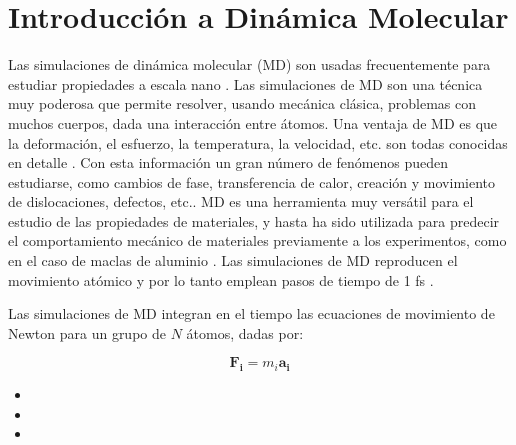 
\section{Introducción a Dinámica Molecular}
\label{S2_2}

Las simulaciones de dinámica molecular (MD) son usadas frecuentemente para estudiar propiedades a escala nano \citep{allen87}. Las simulaciones de MD son una técnica muy poderosa que permite resolver, usando mecánica clásica, problemas con muchos cuerpos, dada una interacción entre átomos. Una ventaja de MD es que la deformación, el esfuerzo, la temperatura, la velocidad, etc. son todas conocidas en detalle \citep{allen87}. Con esta información un gran número de fenómenos pueden estudiarse, como cambios de fase, transferencia de calor, creación y movimiento de dislocaciones, defectos, etc.. MD es una herramienta muy versátil para el estudio de las propiedades de materiales, y hasta ha sido utilizada para predecir el comportamiento mecánico de materiales previamente a los experimentos, como en el caso de maclas de aluminio \citep{chen03}. Las simulaciones de MD reproducen el movimiento atómico y por lo tanto emplean pasos de tiempo de 1 fs \citep{allen87}.

Las simulaciones de MD integran en el tiempo las ecuaciones de movimiento de Newton para un grupo de $N$ átomos, dadas por:

\begin{equation}
\mathbf{F_{i}} = m_{i}\mathbf{a_{i}}
\end{equation}


\begin{itemize}
 \item {}
 \item {}
 \item {}
\end{itemize}


